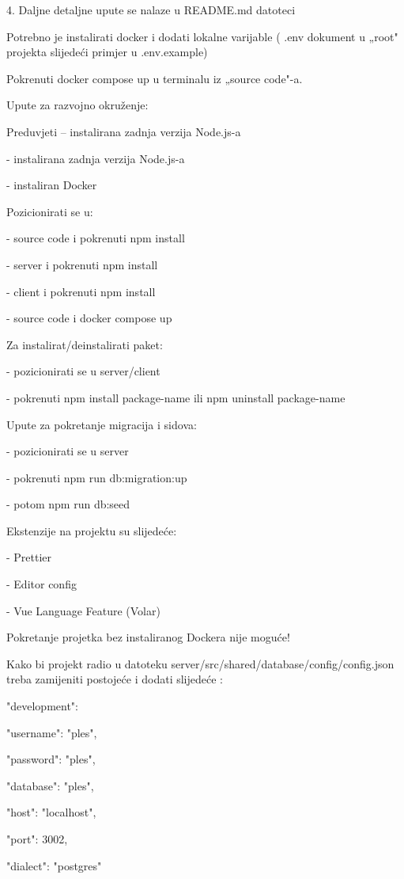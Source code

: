 4.	Daljne detaljne upute se nalaze u README.md datoteci 


Potrebno je instalirati docker i dodati lokalne varijable ( .env dokument u „root" projekta slijedeći primjer u .env.example)

Pokrenuti docker compose up u terminalu iz „source code"-a.

Upute za razvojno okruženje:

Preduvjeti – instalirana zadnja verzija Node.js-a

-	instalirana zadnja verzija Node.js-a

-	instaliran Docker

Pozicionirati se u:

-	source code i pokrenuti npm install

-	server i pokrenuti npm install

-	client i pokrenuti npm install

-	source code i docker compose up

Za instalirat/deinstalirati paket:

-	pozicionirati se u server/client

-	pokrenuti npm install package-name ili npm uninstall package-name

Upute za pokretanje migracija i sidova:

-	pozicionirati se u server

-	pokrenuti npm run db:migration:up 

-	potom npm run db:seed

Ekstenzije na projektu su slijedeće:

-	Prettier

-	Editor config

-	Vue Language Feature (Volar)

Pokretanje projetka bez instaliranog Dockera nije moguće!

Kako bi projekt radio u datoteku server/src/shared/database/config/config.json treba zamijeniti postojeće i dodati slijedeće :



  "development": 

    "username": "ples",

    "password": "ples",

    "database": "ples",

    "host": "localhost",

    "port": 3002,

    "dialect": "postgres"

